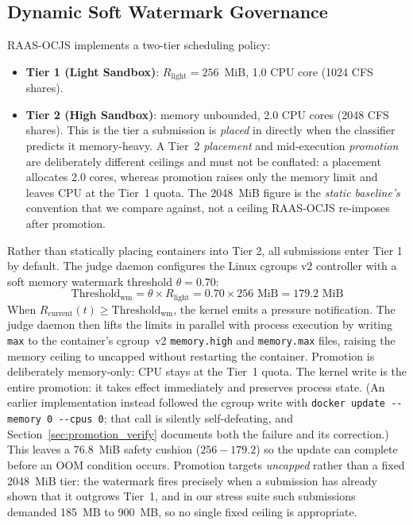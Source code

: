 \documentclass[conference]{IEEEtran}
\begin{document}
\subsection{Dynamic Soft Watermark Governance}
RAAS-OCJS implements a two-tier scheduling policy:
\begin{itemize}
    \item \textbf{Tier 1 (Light Sandbox)}: $R_{\mathrm{light}} = 256$~MiB, 1.0 CPU core (1024 CFS shares).
    \item \textbf{Tier 2 (High Sandbox)}: memory unbounded, 2.0 CPU cores (2048 CFS shares). This is the tier a submission is \emph{placed} in directly when the classifier predicts it memory-heavy. A Tier~2 \emph{placement} and mid-execution \emph{promotion} are deliberately different ceilings and must not be conflated: a placement allocates 2.0 cores, whereas promotion raises only the memory limit and leaves CPU at the Tier~1 quota. The 2048~MiB figure is the \emph{static baseline's} convention that we compare against, not a ceiling RAAS-OCJS re-imposes after promotion.
\end{itemize}
Rather than statically placing containers into Tier 2, all submissions enter Tier 1 by default. The judge daemon configures the Linux cgroups v2 controller with a soft memory watermark threshold $\theta = 0.70$:
\begin{equation}
\mathrm{Threshold}_{\mathrm{wm}} = \theta \times R_{\mathrm{light}} = 0.70 \times 256\text{ MiB} = 179.2\text{ MiB}
\end{equation}
When $R_{\mathrm{current}}(t) \ge \mathrm{Threshold}_{\mathrm{wm}}$, the kernel emits a pressure notification. The judge daemon then lifts the limits in parallel with process execution by writing \texttt{max} to the container's cgroup~v2 \texttt{memory.high} and \texttt{memory.max} files, raising the memory ceiling to uncapped without restarting the container. Promotion is deliberately memory-only: CPU stays at the Tier~1 quota. The kernel write is the entire promotion: it takes effect immediately and preserves process state. (An earlier implementation instead followed the cgroup write with \texttt{docker update -{}-memory 0 -{}-cpus 0}; that call is silently self-defeating, and Section~\ref{sec:promotion_verify} documents both the failure and its correction.) This leaves a 76.8~MiB safety cushion ($256 - 179.2$) so the update can complete before an OOM condition occurs. Promotion targets \emph{uncapped} rather than a fixed 2048~MiB tier: the watermark fires precisely when a submission has already shown that it outgrows Tier~1, and in our stress suite such submissions demanded 185~MB to 900~MB, so no single fixed ceiling is appropriate.
\end{document}
